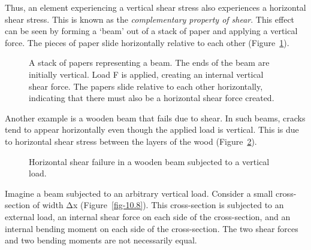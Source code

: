 \documentclass[
  letterpaper,
  DIV=11,
  numbers=noendperiod]{scrreprt}
\theoremstyle{definition}
\theoremstyle{remark}
\begin{document}
Thus, an element experiencing a vertical shear stress also experiences a
horizontal shear stress. This is known as the \emph{complementary
property of shear}. This effect can be seen by forming a `beam' out of a
stack of paper and applying a vertical force. The pieces of paper slide
horizontally relative to each other (Figure~\ref{fig-10.6}).

\begin{figure}


\caption{\label{fig-10.6}A stack of papers representing a beam. The ends
of the beam are initially vertical. Load F is applied, creating an
internal vertical shear force. The papers slide relative to each other
horizontally, indicating that there must also be a horizontal shear
force created.}

\end{figure}%

Another example is a wooden beam that fails due to shear. In such beams,
cracks tend to appear horizontally even though the applied load is
vertical. This is due to horizontal shear stress between the layers of
the wood (Figure~\ref{fig-10.7}).

\begin{figure}


\caption{\label{fig-10.7}Horizontal shear failure in a wooden beam
subjected to a vertical load.}

\end{figure}%

Imagine a beam subjected to an arbitrary vertical load. Consider a small
cross-section of width Δx (Figure~\ref{fig-10.8}). This cross-section is
subjected to an external load, an internal shear force on each side of
the cross-section, and an internal bending moment on each side of the
cross-section. The two shear forces and two bending moments are not
necessarily equal.
\end{document}
